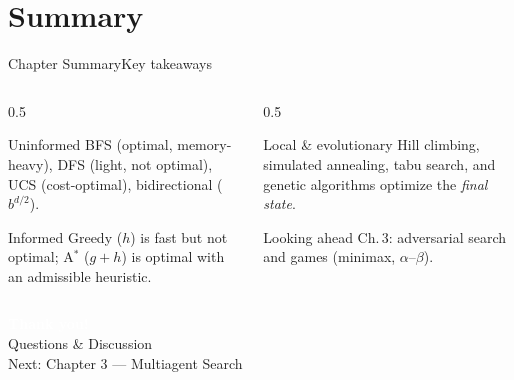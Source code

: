 \documentclass[aspectratio=169,11pt]{beamer}
\begin{document}
\section{Summary}

\begin{frame}{Chapter Summary}{Key takeaways}
  \begin{columns}[T]
    \begin{column}{0.5\textwidth}
      \begin{block}{Uninformed}
        \small BFS (optimal, memory-heavy), DFS (light, not optimal),
        UCS (cost-optimal), bidirectional ($b^{d/2}$).
      \end{block}
      \begin{block}{Informed}
        \small Greedy ($h$) is fast but not optimal; A$^\ast$ ($g{+}h$) is optimal
        with an admissible heuristic.
      \end{block}
    \end{column}
    \begin{column}{0.5\textwidth}
      \begin{exampleblock}{Local \& evolutionary}
        \small Hill climbing, simulated annealing, tabu search, and genetic
        algorithms optimize the \emph{final state}.
      \end{exampleblock}
      \begin{alertblock}{Looking ahead}
        \small Ch.\,3: adversarial search and games (minimax, $\alpha$–$\beta$).
      \end{alertblock}
    \end{column}
  \end{columns}
\end{frame}

{
\begin{frame}
  \vfill
  \begin{center}
    {\LARGE\textcolor{white}{\textbf{Thank you!}}}\\[0.6em]
    {\small\textcolor{PrimaryLight}{Questions \& Discussion}}\\[1.2em]
    {\footnotesize\textcolor{AccentYellow}{Next: Chapter 3 — Multiagent Search}}
  \end{center}
  \vfill
\end{frame}}
\end{document}
